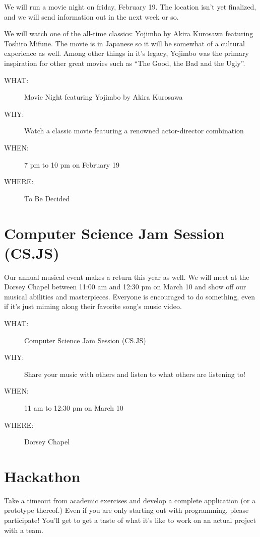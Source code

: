 We will run a movie night on friday, February 19. The location isn't yet
finalized, and we will send information out in the next week or so.

We will watch one of the all-time classics: Yojimbo by Akira Kurosawa featuring
Toshiro Mifune. The movie is in Japanese so it will be somewhat of a cultural
experience as well. Among other things in it's legacy, Yojimbo was the primary
inspiration for other great movies such as \textquotedblleft{}The Good, the Bad and the
Ugly\textquotedblright{}.

\begin{description}
\item[{WHAT:}] Movie Night featuring Yojimbo by Akira Kurosawa
\item[{WHY:}] Watch a classic movie featuring a renowned actor-director combination
\item[{WHEN:}] 7 pm to 10 pm on February 19
\item[{WHERE:}] To Be Decided
\end{description}


\newpage


\section{Computer Science Jam Session (CS.JS)}
\label{sec-7}

Our annual musical event makes a return this year as well. We will meet at the
Dorsey Chapel between 11:00 am and 12:30 pm on March 10 and show off our
musical abilities and masterpieces. Everyone is encouraged to do something,
even if it's just miming along their favorite song's music video.

\begin{description}
\item[{WHAT:}] Computer Science Jam Session (CS.JS)
\item[{WHY:}] Share your music with others and listen to what others are listening to!
\item[{WHEN:}] 11 am to 12:30 pm on March 10
\item[{WHERE:}] Dorsey Chapel
\end{description}


\newpage


\section{Hackathon}
\label{sec-8}

Take a timeout from academic exercises and develop a complete application (or a
prototype thereof.) Even if you are only starting out with programming, please
participate! You'll get to get a taste of what it's like to work on an actual
project with a team.

